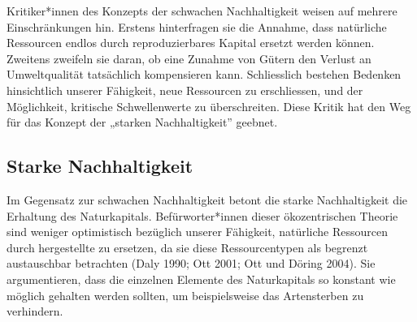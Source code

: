 \documentclass[
  nswissgerman,
  a4paper,
  DIV=11,
  numbers=noendperiod,
  oneside,
  openany]{scrreprt}
\begin{document}
Kritiker*innen des Konzepts der schwachen Nachhaltigkeit weisen auf
mehrere Einschränkungen hin. Erstens hinterfragen sie die Annahme, dass
natürliche Ressourcen endlos durch reproduzierbares Kapital ersetzt
werden können. Zweitens zweifeln sie daran, ob eine Zunahme von Gütern
den Verlust an Umweltqualität tatsächlich kompensieren kann.
Schliesslich bestehen Bedenken hinsichtlich unserer Fähigkeit, neue
Ressourcen zu erschliessen, und der Möglichkeit, kritische
Schwellenwerte zu überschreiten. Diese Kritik hat den Weg für das
Konzept der „starken Nachhaltigkeit'' geebnet.

\subsection{Starke Nachhaltigkeit}\label{starke-nachhaltigkeit}

Im Gegensatz zur schwachen Nachhaltigkeit betont die starke
Nachhaltigkeit die Erhaltung des Naturkapitals. Befürworter*innen dieser
ökozentrischen Theorie sind weniger optimistisch bezüglich unserer
Fähigkeit, natürliche Ressourcen durch hergestellte zu ersetzen, da sie
diese Ressourcentypen als begrenzt austauschbar betrachten (Daly 1990;
Ott 2001; Ott und Döring 2004). Sie argumentieren, dass die einzelnen
Elemente des Naturkapitals so konstant wie möglich gehalten werden
sollten, um beispielsweise das Artensterben zu verhindern.

\begingroup\fontsize{8}{10}\selectfont
\end{document}
